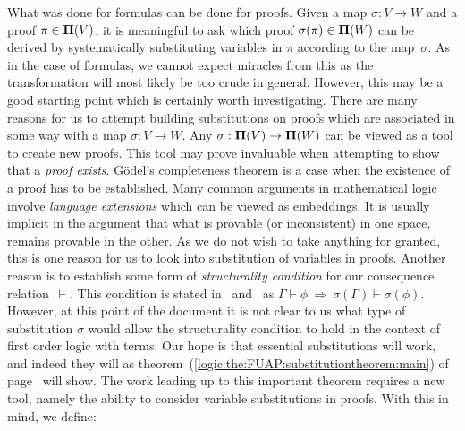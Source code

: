 What was done for formulas can be done for proofs. Given a map
$\sigma:V\to W$ and a proof $\pi\in\mbox{${\bf\Pi}(V)$}$, it is meaningful to ask
which proof $\sigma(\pi)\in{\bf\Pi}(W)$ can be derived by
systematically substituting variables in $\pi$ according to the
map~$\sigma$. As in the case of formulas, we cannot expect miracles
from this as the transformation will most likely be too crude in
general. However, this may be a good starting point which is
certainly worth investigating. There are many reasons for us to
attempt building substitutions on proofs which are associated in
some way with a map $\sigma:V\to W$. Any $\sigma:\mbox{${\bf\Pi}(V)$}\to{\bf\Pi}(W)$
can be viewed as a tool to create new proofs. This tool may prove
invaluable when attempting to show that a {\em proof exists}.
G\"odel's completeness theorem is a case when the existence of a
proof has to be established. Many common arguments in mathematical
logic involve {\em language extensions} which can be viewed as
embeddings. It is usually implicit in the argument that what is
provable (or inconsistent) in one space, remains provable in the
other. As we do not wish to take anything for granted, this is one
reason for us to look into substitution of variables in proofs.
Another reason is to establish some form of {\em structurality
condition} for our consequence relation~$\vdash$. This condition is
stated in~\cite{BlokPigozzi} and~\cite{Rivieccio} as
$\Gamma\vdash\phi\ \Rightarrow\ \sigma(\Gamma)\vdash\sigma(\phi)$.
However, at this point of the document it is not clear to us what
type of substitution $\sigma$ would allow the structurality
condition to hold in the context of first order logic with terms.
Our hope is that essential substitutions will work, and indeed they
will as theorem~(\ref{logic:the:FUAP:substitutiontheorem:main}) of
page~\pageref{logic:the:FUAP:substitutiontheorem:main} will show.
The work leading up to this important theorem requires a new tool,
namely the ability to consider variable substitutions in proofs.
With this in mind, we define: 
